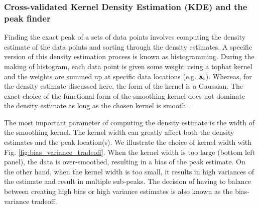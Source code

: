 \subsubsection{Cross-validated Kernel Density Estimation (KDE) and the peak finder} 
\label{subsubsec:KDE}
Finding the exact peak of a sets of data points 
involves computing the density estimate of the data points and sorting through
the density estimates. A specific version of this density estimation process is
known as histogramming. During the making of histogram, each data point is
given some weight using a tophat kernel and the weights are summed up at
specific data locations (e.g. $\bf{x}_i$). Whereas,
for the density estimate discussed here, the form of the kernel is a
Gaussian. The exact choice of the functional form of the smoothing kernel does
not dominate the density estimate as long as the chosen kernel is
smooth \citep{Feigelson2014}. 

The most important parameter of computing the density estimate is the width of the 
smoothing kernel. The kernel width can greatly affect both the density estimates and 
the peak location(s). We illustrate the choice of kernel width with Fig.
\ref{fig:bias_variance_tradeoff}. When the kernel width is
too large (bottom left panel), the data is over-smoothed, 
resulting in a bias of the peak estimate. On the other hand, when the kernel
width is too small, it results in high variances of the estimate and result in
multiple sub-peaks. The decision of having to balance between creating high
bias or high variance estimates is also known as the bias-variance tradeoff. 

